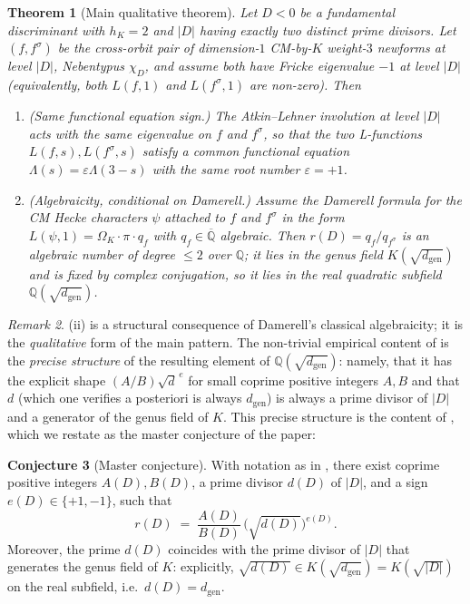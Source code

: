 \documentclass[11pt]{amsart}
\newtheorem{theorem}{Theorem}
\theoremstyle{definition}
\newtheorem{conjecture}[theorem]{Conjecture}
\theoremstyle{remark}
\newtheorem{remark}[theorem]{Remark}
\newcommand{\Q}{\mathbb{Q}}
\newcommand{\chiD}{\chi_D}
\begin{document}
\begin{theorem}[Main qualitative theorem]\label{thm:main}
Let \(D < 0\) be a fundamental discriminant with \(h_{K} = 2\) and
\(|D|\) having exactly two distinct prime divisors. Let
\((f, f^{\sigma})\) be the cross-orbit pair of dimension-\(1\)
CM-by-\(K\) weight-\(3\) newforms at level \(|D|\), Nebentypus
\(\chiD\), and assume both have Fricke eigenvalue \(-1\) at level
\(|D|\) (equivalently, both \(L(f, 1)\) and \(L(f^{\sigma}, 1)\) are
non-zero). Then
\begin{enumerate}
\item[\emph{(i)}] \emph{(Same functional equation sign.)} The Atkin--Lehner
  involution at level \(|D|\) acts with the same eigenvalue on
  \(f\) and \(f^{\sigma}\), so that the two L-functions
  \(L(f, s), L(f^{\sigma}, s)\) satisfy a common functional equation
  \(\Lambda(s) = \varepsilon \Lambda(3 - s)\) with the same root
  number \(\varepsilon = +1\).
\item[\emph{(ii)}] \emph{(Algebraicity, conditional on Damerell.)}
  Assume the Damerell formula \cite[Thm.~1]{Damerell1971} for the
  CM Hecke characters \(\psi\) attached to \(f\) and \(f^{\sigma}\)
  in the form
  \(L(\psi, 1) = \Omega_{K} \cdot \pi \cdot q_{f}\) with
  \(q_{f} \in \overline{\Q}\) algebraic. Then
  \(r(D) = q_{f}/q_{f^{\sigma}}\) is an algebraic number of degree
  \(\le 2\) over \(\Q\); it lies in the genus field
  \(K(\sqrt{d_{\mathrm{gen}}})\) and is fixed by complex
  conjugation, so it lies in the real quadratic subfield
  \(\Q(\sqrt{d_{\mathrm{gen}}})\).
\end{enumerate}
\end{theorem}

\begin{remark}
(ii) is a structural consequence of Damerell's
classical algebraicity; it is the \emph{qualitative} form of the
main pattern. The non-trivial empirical content of 
is the \emph{precise structure} of the resulting element of
\(\Q(\sqrt{d_{\mathrm{gen}}})\): namely, that it has the explicit
shape \((A/B)\sqrt{d}^{\,e}\) for small coprime positive integers
\(A, B\) and that \(d\) (which one verifies a posteriori is always
\(d_{\mathrm{gen}}\)) is always a prime divisor of \(|D|\) and a
generator of the genus field of \(K\). This precise structure is
the content of , which we restate as the master
conjecture of the paper:
\end{remark}

\begin{conjecture}[Master conjecture]\label{conj:master}
With notation as in , there exist coprime positive
integers \(A(D), B(D)\), a prime divisor \(d(D)\) of \(|D|\), and a
sign \(e(D) \in \{+1, -1\}\), such that
\begin{equation}\label{eq:master}
   r(D)
   \;=\;
   \frac{A(D)}{B(D)}\, \bigl(\sqrt{d(D)}\bigr)^{e(D)}.
\end{equation}
Moreover, the prime \(d(D)\) coincides with the prime divisor of
\(|D|\) that generates the genus field of \(K\): explicitly,
\(\sqrt{d(D)} \in K(\sqrt{d_{\mathrm{gen}}}) = K(\sqrt{|D|})\) on the
real subfield, i.e.\ \(d(D) = d_{\mathrm{gen}}\).
\end{conjecture}
\end{document}
